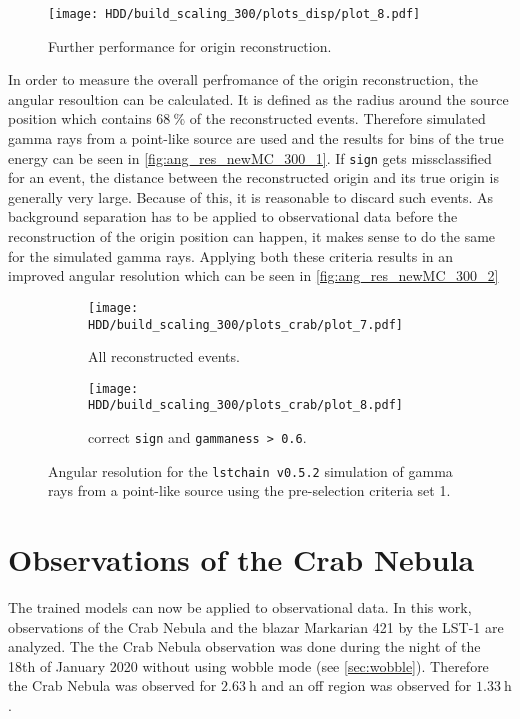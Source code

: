 \begin{figure}
    \centering
    \texttt{[image: HDD/build\_scaling\_300/plots\_disp/plot\_8.pdf]}
    \caption{Further performance for origin reconstruction.}
    \label{fig:origin_newMC_300_5}
\end{figure}

In order to measure the overall perfromance of the origin reconstruction, the angular resoultion can be calculated.
It is defined as the radius around the source position which contains $\SI{68}{\percent}$ of the reconstructed events.
Therefore simulated gamma rays from a point-like source are used and the results for bins of the true energy can be seen in \autoref{fig:ang_res_newMC_300_1}.
If \texttt{sign} gets missclassified for an event, the distance between the reconstructed origin and its true origin is generally very large.
Because of this, it is reasonable to discard such events.
As background separation has to be applied to observational data before the reconstruction of the origin position can happen, it makes sense to do the same
for the simulated gamma rays.
Applying both these criteria results in an improved angular resolution which can be seen in \autoref{fig:ang_res_newMC_300_2}
\begin{figure}
    \centering
    \begin{subfigure}{0.49\textwidth}
        \centering
        \texttt{[image: HDD/build\_scaling\_300/plots\_crab/plot\_7.pdf]}
        \caption{All reconstructed events.}
        \label{fig:ang_res_newMC_300_1}
    \end{subfigure}
    \hfill
    \begin{subfigure}{0.49\textwidth}
        \centering
        \texttt{[image: HDD/build\_scaling\_300/plots\_crab/plot\_8.pdf]}
        \caption{correct \texttt{sign} and \texttt{gammaness > 0.6}.}
        \label{fig:ang_res_newMC_300_2}
    \end{subfigure}
    \caption{Angular resolution for the \texttt{lstchain v0.5.2} simulation of gamma rays from a point-like source using the pre-selection criteria set 1.}
\end{figure}




\section{Observations of the Crab Nebula}
The trained models can now be applied to observational data.
In this work, observations of the Crab Nebula and the blazar Markarian 421 by the LST-1 are analyzed.
The the Crab Nebula observation was done during the night of the 18th of January 2020 without using wobble mode (see \autoref{sec:wobble}).
Therefore the Crab Nebula was observed for $\SI{2.63}{\hour}$ and an off region was observed for $\SI{1.33}{\hour}$.

